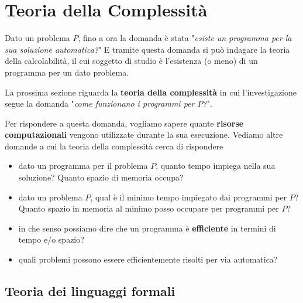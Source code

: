
\chapter{Teoria della Complessità}

Dato un problema $P$, fino a ora la domanda è stata "\textit{esiste un programma per la sua soluzione automatica?}" E tramite questa domanda si può indagare la teoria della calcolabilità, il cui soggetto di studio è l'esistenza (o meno) di un programma per un dato problema.

La prossima sezione riguarda la \textbf{teoria della complessità} in cui l'investigazione segue la domanda "\textit{come funzionano i programmi per $P$?}".

Per rispondere a questa domanda, vogliamo sapere quante \textbf{risorse computazionali} vengono utilizzate durante la sua esecuzione. Vediamo altre domande a cui la teoria della complessità cerca di rispondere
\begin{itemize}
	\item dato un programma per il problema $P$, quanto tempo impiega nella sua soluzione? Quanto spazio di memoria occupa? 
	\item dato un problema $P$, qual è il minimo tempo impiegato dai programmi per $P$? Quanto spazio in memoria al minimo posso occupare per programmi per $P$? 
	\item in che senso possiamo dire che un programma è \textbf{efficiente} in termini di tempo e/o spazio? 
	\item quali problemi possono essere efficientemente risolti per via automatica?
\end{itemize}

\section{Teoria dei linguaggi formali}


